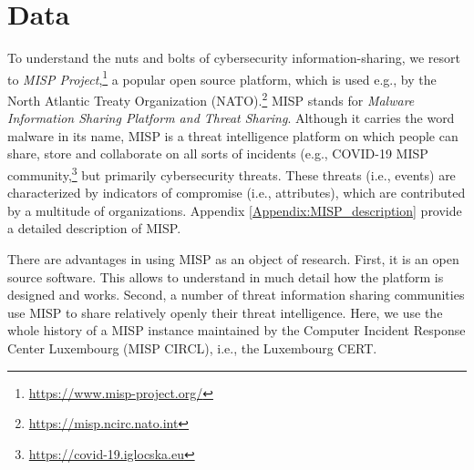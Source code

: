 \documentclass[unnumsec,webpdf,contemporary,large]{oup-authoring-template}%
\theoremstyle{thmstyleone}%
\theoremstyle{thmstyletwo}%
\theoremstyle{thmstylethree}%
\begin{document}
\section{Data}
\label{sec:data}

To understand the nuts and bolts of cybersecurity information-sharing, we resort to {\it MISP Project},\footnote{\url{https://www.misp-project.org/}} a popular open source platform, which is used e.g., by the North Atlantic Treaty Organization (NATO).\footnote{\url{https://misp.ncirc.nato.int}} MISP stands for {\it Malware Information Sharing Platform and Threat Sharing}. Although it carries the word malware in its name, MISP is a threat intelligence platform on which people can share, store and collaborate on all sorts of incidents (e.g., COVID-19 MISP community,\footnote{\url{https://covid-19.iglocska.eu}} but primarily cybersecurity threats. These threats (i.e., events) are characterized by indicators of compromise (i.e., attributes), which are contributed by a multitude of organizations. Appendix \ref{Appendix:MISP_description} provide a detailed description of MISP. 

There are advantages in using MISP as an object of research. First, it is an open source software. This allows to understand in much detail how the platform is designed and works. Second, a number of threat information sharing communities use MISP to share relatively openly their threat intelligence. Here, we use the whole history of a MISP instance maintained by the Computer Incident Response Center Luxembourg (MISP CIRCL), i.e., the Luxembourg CERT.
\end{document}
